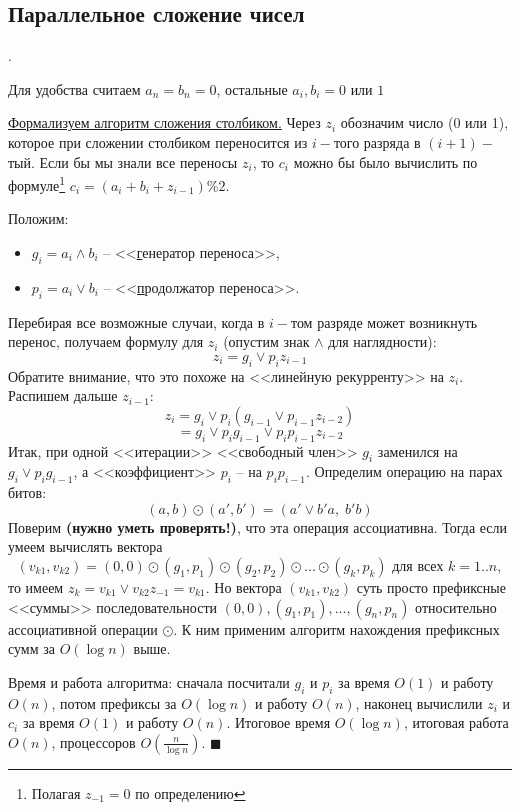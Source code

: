 \subsection{Параллельное сложение чисел}
.

 Для удобства считаем $a_n = b_n = 0$, остальные $a_i, b_i = 0\text{ или }1$

\underline{Формализуем алгоритм сложения столбиком.} Через $z_i$ обозначим число (0 или 1), которое при сложении столбиком переносится из $i-$того разряда в $(i+1)-$тый. Если бы мы знали все переносы $z_i$, то $c_i$ можно бы было вычислить по формуле\footnote{Полагая $z_{-1}=0$ по определению} $c_i = (a_i+b_i+z_{i-1})\%2$.

Положим:
\begin{itemize}
\item $g_i = a_i \land b_i$ -- <<\underline{г}енератор переноса>>,
\item $p_i = a_i \lor b_i$ -- <<\underline{п}родолжатор переноса>>.
\end{itemize}
Перебирая все возможные случаи, когда в $i-$том разряде может возникнуть перенос, получаем формулу для $z_i$ (опустим знак $\land$ для наглядности): 
$$z_i = g_i \lor p_i z_{i-1}$$
Обратите внимание, что это похоже на <<линейную рекурренту>> на $z_i$. Распишем дальше $z_{i-1}$:
$$z_i = g_i \lor p_i(g_{i-1} \lor p_{i-1} z_{i-2})$$ $$ =g_i \lor p_i g_{i-1} \lor p_i p_{i-1} z_{i-2}$$
Итак, при одной <<итерации>> <<свободный член>> $g_i$ заменился на $g_i \lor p_i g_{i-1}$, а <<коэффициент>> $p_i$ -- на $p_i p_{i-1}$.
Определим операцию на парах битов: $$(a,b) \odot (a', b') = (a' \lor b' a, \;b' b)$$
Поверим \textbf{(нужно уметь проверять!)}, что эта операция ассоциативна. 
Тогда если умеем вычислять вектора $$(v_{k1}, v_{k2}) = (0, 0)\odot (g_1, p_1)\odot (g_2, p_2)\odot ... \odot (g_k, p_k) \text{ для всех } k=1..n,$$ то имеем $z_k = v_{k1} \lor v_{k2}z_{-1} = v_{k1}$. Но вектора $(v_{k1}, v_{k2})$ суть просто префиксные <<суммы>> последовательности $(0, 0), (g_1, p_1), ..., (g_n, p_n)$ относительно ассоциативной операции $\odot$. К ним применим алгоритм нахождения префиксных сумм за $O(\log n)$ выше.

Время и работа алгоритма: сначала посчитали $g_i$ и $p_i$ за время $O(1)$ и работу $O(n)$, потом префиксы за $O(\log n)$ и работу $O(n)$, наконец вычислили $z_i$ и $c_i$ за время $O(1)$  и работу $O(n)$. Итоговое время $O(\log n)$, итоговая работа $O(n)$, процессоров $O(\frac{n}{\log n})$. $\blacksquare$
 
